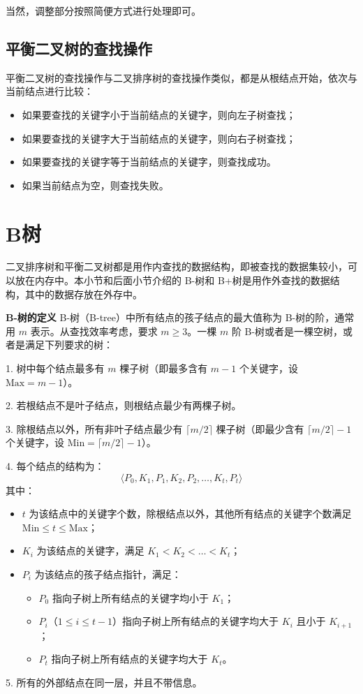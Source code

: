 \documentclass[lang=cn,newtx,10pt,scheme=chinese]{elegantbook}
\begin{document}
   当然，调整部分按照简便方式进行处理即可。

   \subsection{平衡二叉树的查找操作}

平衡二叉树的查找操作与二叉排序树的查找操作类似，都是从根结点开始，依次与当前结点进行比较：
\begin{itemize}
  \item 如果要查找的关键字小于当前结点的关键字，则向左子树查找；
  \item 如果要查找的关键字大于当前结点的关键字，则向右子树查找；
  \item 如果要查找的关键字等于当前结点的关键字，则查找成功。
  \item 如果当前结点为空，则查找失败。
  \end{itemize}




\section{B树}


二叉排序树和平衡二叉树都是用作内查找的数据结构，即被查找的数据集较小，可以放在内存中。本小节和后面小节介绍的 B-树和 B+树是用作外查找的数据结构，其中的数据存放在外存中。


\textbf{B-树的定义}  
B-树（B-tree）中所有结点的孩子结点的最大值称为 B-树的阶，通常用 $m$ 表示。从查找效率考虑，要求 $m \geq 3$。一棵 $m$ 阶 B-树或者是一棵空树，或者是满足下列要求的树：

1. 树中每个结点最多有 $m$ 棵子树（即最多含有 $m-1$ 个关键字，设 $\text{Max} = m-1$）。

2. 若根结点不是叶子结点，则根结点最少有两棵子树。

3. 除根结点以外，所有非叶子结点最少有 $\lceil m/2 \rceil$ 棵子树（即最少含有 $\lceil m/2 \rceil - 1$ 个关键字，设 $\text{Min} = \lceil m/2 \rceil - 1$）。

4. 每个结点的结构为：
   \[
   \langle P_0, K_1, P_1, K_2, P_2, \dots, K_t, P_t \rangle
   \]
   其中：
   \begin{itemize}
     \item $t$ 为该结点中的关键字个数，除根结点以外，其他所有结点的关键字个数满足 $\text{Min} \leq t \leq \text{Max}$；
     \item $K_i$ 为该结点的关键字，满足 $K_1 < K_2 < \dots < K_t$；
     \item $P_i$ 为该结点的孩子结点指针，满足：
       \begin{itemize}
         \item $P_0$ 指向子树上所有结点的关键字均小于 $K_1$；
         \item $P_i$（$1 \leq i \leq t-1$）指向子树上所有结点的关键字均大于 $K_i$ 且小于 $K_{i+1}$；
         \item $P_t$ 指向子树上所有结点的关键字均大于 $K_t$。
       \end{itemize}
   \end{itemize}
5. 所有的外部结点在同一层，并且不带信息。
\end{document}
